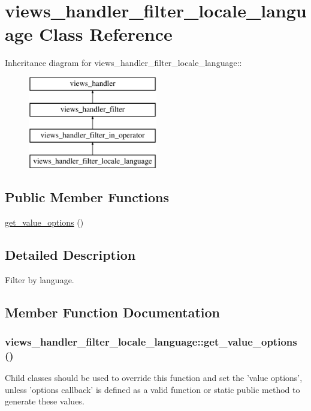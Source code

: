 \hypertarget{classviews__handler__filter__locale__language}{
\section{views\_\-handler\_\-filter\_\-locale\_\-language Class Reference}
\label{classviews__handler__filter__locale__language}
}
Inheritance diagram for views\_\-handler\_\-filter\_\-locale\_\-language::\begin{figure}[H]
\begin{center}
\leavevmode
\includegraphics[height=4cm]{classviews__handler__filter__locale__language}
\end{center}
\end{figure}
\subsection*{Public Member Functions}
\begin{DoxyCompactItemize}
\item 
\hyperlink{classviews__handler__filter__locale__language_aca1d25b19b4be6fa8e5745d15a0a07c1}{get\_\-value\_\-options} ()
\end{DoxyCompactItemize}


\subsection{Detailed Description}
Filter by language. 

\subsection{Member Function Documentation}
\hypertarget{classviews__handler__filter__locale__language_aca1d25b19b4be6fa8e5745d15a0a07c1}{
\subsubsection[{get\_\-value\_\-options}]{\setlength{\rightskip}{0pt plus 5cm}views\_\-handler\_\-filter\_\-locale\_\-language::get\_\-value\_\-options ()}}
\label{classviews__handler__filter__locale__language_aca1d25b19b4be6fa8e5745d15a0a07c1}
Child classes should be used to override this function and set the 'value options', unless 'options callback' is defined as a valid function or static public method to generate these values.

